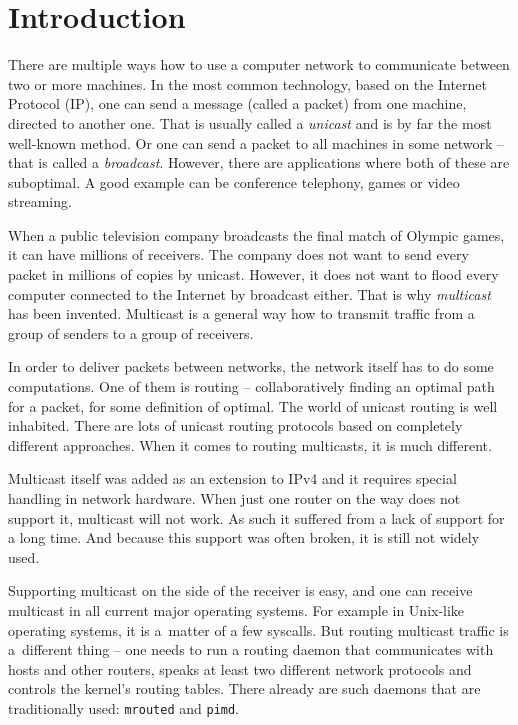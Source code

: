 \chapter*{Introduction}

There are multiple ways how to use a computer network to communicate between two
or more machines. In the most common technology, based on the Internet Protocol
(IP), one can send a message (called a packet) from one machine, directed to
another one. That is usually called a \emph{unicast} and is by far the most well-known
method. Or one can send a packet to all machines in some network -- that is
called a \emph{broadcast}. However, there are applications where both of these
are suboptimal. A good example can be conference telephony, games or video
streaming.

When a public television company broadcasts the final match of Olympic games, it can
have millions of receivers. The company does not want to send every packet in
millions of copies by unicast. However, it does not want to flood every
computer connected to the Internet by broadcast either. That is why \emph{multicast} has
been invented. Multicast is a general way how to transmit traffic from a group of
senders to a group of receivers.

In order to deliver packets between networks, the network itself has to do some
computations. One of them is routing -- collaboratively finding an optimal path
for a packet, for some definition of optimal.
The world of unicast routing is well inhabited. There are lots of unicast routing
protocols based on completely different approaches. When it comes to routing
multicasts, it is much different.

Multicast itself was added as an extension to IPv4 and it requires special
handling in network hardware. When just one router on the way does not support
it, multicast will not work. As such it suffered from a lack of support for a long
time. And because this support was often broken, it is still not widely used.

Supporting multicast on the side of the receiver is easy, and one can receive
multicast in all current major operating systems. For example in Unix-like operating systems, it is
a~matter of a few syscalls. But routing multicast traffic is a~different thing
-- one needs to run a routing daemon that communicates with hosts and other
routers, speaks at least two different network protocols and controls the
kernel's routing tables. There already are such daemons that are traditionally
used: \texttt{mrouted} and \texttt{pimd}.

